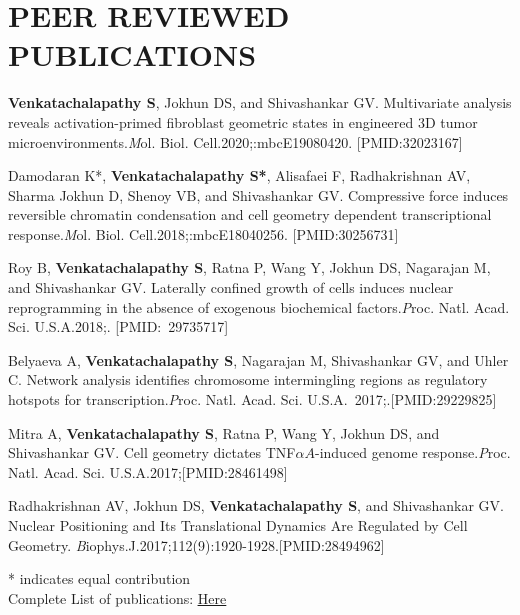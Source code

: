 \documentclass[letterpaper,11pt]{article}
\begin{document}
\vspace{1mm}
\section{\bf PEER REVIEWED PUBLICATIONS}
\begin{etaremune}[itemsep=0pt,parsep=0pt]
    \item {\bf Venkatachalapathy S}, Jokhun DS, and Shivashankar GV. Multivariate analysis reveals activation-primed fibroblast geometric states in engineered 3D tumor microenvironments.{\emph Mol. Biol. Cell}.2020;:mbcE19080420. [PMID:32023167]
    \item Damodaran K*, {\bf Venkatachalapathy S*}, Alisafaei F, Radhakrishnan AV, Sharma Jokhun D, Shenoy VB, and Shivashankar GV. Compressive force induces reversible chromatin condensation and cell geometry dependent transcriptional response.{\emph Mol. Biol. Cell}.2018;:mbcE18040256. [PMID:30256731]
    \item Roy B, {\bf Venkatachalapathy S}, Ratna P, Wang Y, Jokhun DS, Nagarajan M, and Shivashankar GV. Laterally confined growth of cells induces nuclear reprogramming in the absence of exogenous biochemical factors.{\emph Proc. Natl. Acad. Sci. U.S.A}.2018;. [PMID: 29735717]
    \item Belyaeva A, {\bf Venkatachalapathy S}, Nagarajan M, Shivashankar GV, and Uhler C. Network analysis identifies chromosome intermingling regions as regulatory hotspots for transcription.{\emph Proc. Natl. Acad. Sci. U.S.A}. 2017;.[PMID:29229825]
    \item Mitra A, {\bf Venkatachalapathy S}, Ratna P, Wang Y, Jokhun DS, and Shivashankar GV. Cell geometry dictates TNF$\alpha A$-induced genome response.{\emph Proc. Natl. Acad. Sci. U.S.A}.2017;[PMID:28461498]
    \item Radhakrishnan AV, Jokhun DS, {\bf Venkatachalapathy S}, and Shivashankar GV. Nuclear Positioning and Its Translational Dynamics Are Regulated by Cell Geometry. {\emph Biophys.J}.2017;112(9):1920-1928.[PMID:28494962]
\end{etaremune}
* indicates equal contribution\\
Complete List of publications: {\href{https://tinyurl.com/pulications-sv}{\underline {Here}}}
\end{document}
